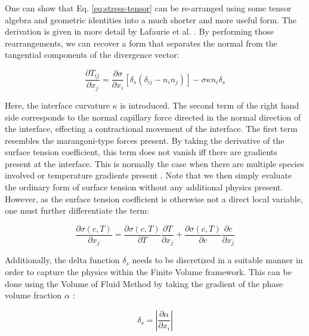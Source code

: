 \documentclass[conference,final]{IEEEtran}
\begin{document}
One can show that Eq. \ref{eq:stress-tensor} can be re-arranged using some tensor algebra and geometric identities into a much shorter and more useful form. The derivation is given in more detail by Lafaurie et al. \cite{lafaurieModellingMergingFragmentation1994}. By performing those rearrangements, we can recover a form that separates the normal from the tangential components of the divergence vector:

\begin{equation}
\label{eq:divergence-capillarystress}
    \frac{\partial T_{ij}}{\partial x_j} = \frac{\partial \sigma}{\partial x_i} [\delta_s(\delta_{ij} - n_i n_j)] - \sigma \kappa n_i \delta_s 
\end{equation}

Here, the interface curvature $\kappa$ is introduced. The second term of the right hand side corresponds to the normal capillary force directed in the normal direction of the interface, effecting a contractional movement of the interface. The first term resembles the marangoni-type forces present. By taking the derivative of the surface tension coefficient, this term does not vanish iff there are gradients present at the interface. This is normally the case when there are multiple species involved or temperature gradients present \cite{j.straubThermokapillareGrenzflachenkonvektionGasblasen1990}. Note that we then simply evaluate the ordinary form of surface tension without any additional physics present. However, as the surface tension coefficient is otherwise not a direct local variable, one must further differentiate the term:

\begin{equation}
    \frac{\partial \sigma(c,T)}{\partial x_j} = \frac{\partial \sigma(c,T)}{\partial T} \frac{\partial T}{\partial x_j} + \frac{\partial \sigma(c,T)}{\partial c} \frac{\partial c}{\partial x_j}
    \label{eq:sigmadiff}
\end{equation}

Additionally, the delta function $\delta_s$ needs to be discretized in a suitable manner in order to capture the physics within the Finite Volume framework. This can be done using the Volume of Fluid Method by taking the gradient of the phase volume fraction $\alpha$ \cite{gueyffierVolumeofFluidInterfaceTracking1999,hirtVolumeFluidVOF1981}:

\begin{equation}
    \delta_s = \left\lvert \frac{\partial \alpha}{\partial x_i} \right\rvert
\end{equation}
\end{document}
